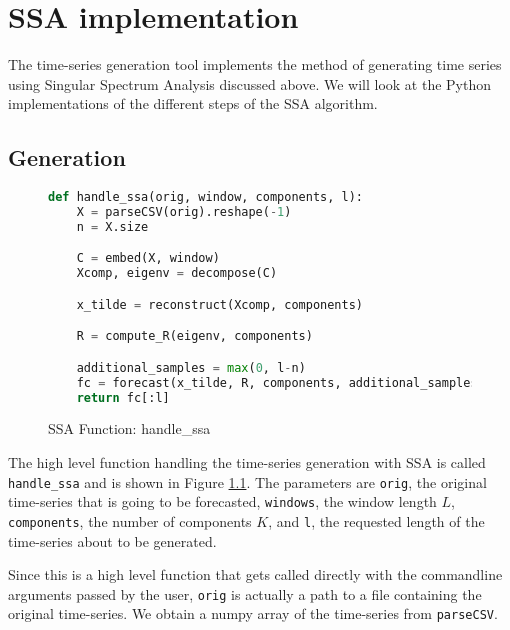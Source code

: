 
\chapter{SSA implementation}\label{chapter:ssa-impl}

The time-series generation tool implements the method of generating time series using Singular Spectrum Analysis discussed above. We will look at the Python implementations of the different steps of the SSA algorithm. \parencite{tsgenerator}

\section{Generation}

\begin{figure}
\begin{singlespace}
\begin{lstlisting}[language=Python]
def handle_ssa(orig, window, components, l):
    X = parseCSV(orig).reshape(-1)
    n = X.size

    C = embed(X, window)
    Xcomp, eigenv = decompose(C)

    x_tilde = reconstruct(Xcomp, components)

    R = compute_R(eigenv, components)

    additional_samples = max(0, l-n)
    fc = forecast(x_tilde, R, components, additional_samples)
    return fc[:l]
\end{lstlisting}
\end{singlespace}
\caption{SSA Function: handle\_ssa}    
\label{fig:ssa-handle}
\end{figure}

The high level function handling the time-series generation with SSA is called \texttt{handle\_ssa} and is shown in Figure \ref{fig:ssa-handle}. The parameters are \texttt{orig}, the original time-series that is going to be forecasted, \texttt{windows}, the window length $L$, \texttt{components}, the number of components $K$, and \texttt{l}, the requested length of the time-series about to be generated. 

Since this is a high level function that gets called directly with the commandline arguments passed by the user, \texttt{orig} is actually a path to a file containing the original time-series. We obtain a numpy array of the time-series from \texttt{parseCSV}.

